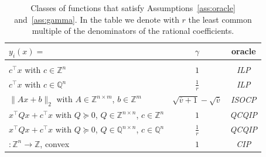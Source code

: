 \documentclass[preprint,12pt]{elsarticle}
\def\Q{\mathbb{Q}}
\def\Z{\mathbb{Z}}
\begin{document}
\begin{table}[h!]
\caption{Classes of functions that satisfy Assumptions~\ref{ass:oracle} and~\ref{ass:gamma}. In the table we denote with $r$ the least
common multiple of the denominators of the rational coefficients.}\label{tab:classes}
\begin{tabular}{||l| c| c||}
\hline\hline
$y_i(x)=$ & $\gamma$ & oracle\\
\hline\hline
& & \\[-1.5ex]
$  c^\top x$ with $c\in \Z^n$ & $1$ & \emph{ILP}\\[1.5ex]
$  c^\top x$ with $c\in \Q^n$ & $\frac 1 r$ & \emph{ILP}\\[1.5ex]
$  \|Ax +b\|_2$ with $A\in \Z^{n\times m}$, $b\in \Z^m$  & $\sqrt{\bar v+1}-\sqrt{\bar v}$ & \emph{ISOCP}\\[1.5ex]
$  x^\top Q x + c^\top x$ with $Q\succeq 0$, $Q\in \Z^{n\times n}$, $c\in \Z^n$  & $1$ & \emph{QCQIP}\\[1.5ex]
$  x^\top Q x + c^\top x$ with $Q\succeq 0$, $Q\in \Q^{n\times n}$, $c\in \Q^n$  & $\frac 1 r$ & \emph{QCQIP}\\[1.5ex]
$:\Z^n\rightarrow \Z$, convex & $1$& \emph{CIP}\\[1.0ex]
\hline\hline
\end{tabular}
\end{table}


\end{document}

